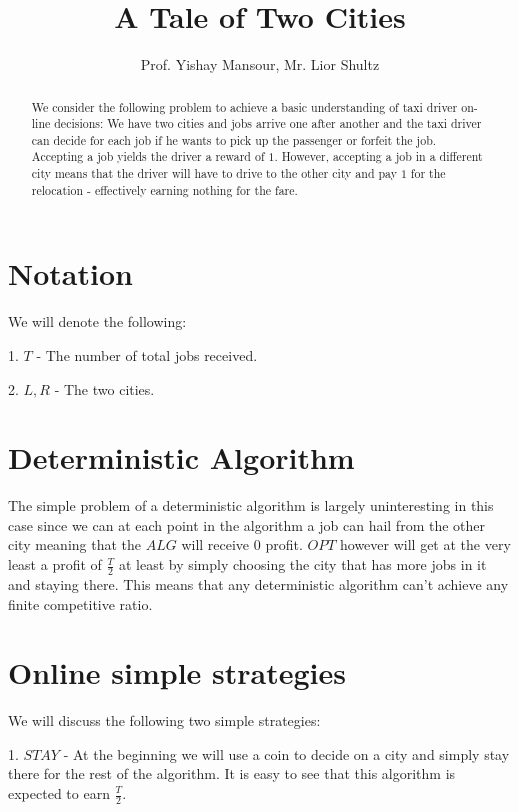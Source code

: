 \documentclass[]{article}
\title{A Tale of Two Cities}
\author{Prof. Yishay Mansour, Mr. Lior Shultz}
\begin{document}
\maketitle

\begin{abstract}

We consider the following problem to achieve a basic understanding of taxi driver on-line decisions:
	We have two cities and jobs arrive one after another and the taxi driver can decide for each job if he wants to pick up the passenger or forfeit the job.
	Accepting a job yields the driver a reward of $ 1 $. However, accepting a job in a different city means that the driver will have to drive to the other city and pay $ 1 $ for the relocation - effectively earning nothing for the fare.

\end{abstract}

\section{Notation}

We will denote the following:

1. $ T $ - The number of total jobs received.

2. $ L , R $ - The two cities.

\section{Deterministic Algorithm}

The simple problem of a deterministic algorithm is largely uninteresting in this case since we can at each point in the algorithm a job can hail from the other city meaning that the $ ALG $ will receive $ 0 $ profit. $ OPT $ however will get at the very least a profit of $ \frac{T}{2} $ at least by simply choosing the city that has more jobs in it and staying there. This means that any deterministic algorithm can't achieve any finite competitive ratio.

\section{Online simple strategies}

We will discuss the following two simple strategies:

1. $ STAY $ - At the beginning we will use a coin to decide on a city and simply stay there for the rest of the algorithm. It is easy to see that this algorithm is expected to earn $ \frac{T}{2} $.
\end{document}
